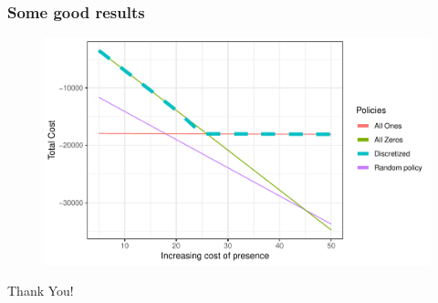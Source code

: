 \documentclass[aspectratio=169]{beamer}
\begin{document}
\begin{frame}
	\frametitle{Some good results}
	\begin{figure}
		\centering
		\includegraphics[scale=.8]{marek_plot.pdf}
		\label{fig:Marek}
	\end{figure}
	
\end{frame}

\begin{frame}
	\begin{center}
		\Huge Thank You!
	\end{center}
\end{frame}








\end{document}
